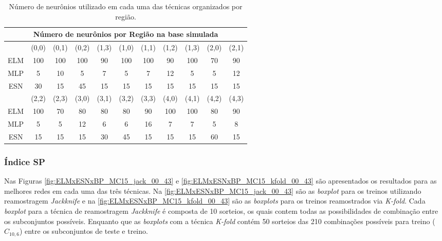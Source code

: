 \begin{table}[H]
	\centering
	\caption{Número de neurônios utilizado em cada uma das técnicas organizados por região.}
	\label{tab:nNeu_MC2015}
	\begin{small}
		\setlength{\extrarowheight}{2pt}       %
		\begin{tabular}{c*{10}c} \toprule
			\multicolumn{11}{c}{Número de neurônios por Região na base simulada}  \\ \midrule
			& (0,0) &  (0,1)  &  (0,2)  &  (1,3) &  (1,0)  &  (1,1)  &  (1,2)  &  (1,3)  & (2,0) & (2,1) \\ \cmidrule(lr){2-2}\cmidrule(lr){3-3}\cmidrule(lr){4-4}\cmidrule(lr){5-5}\cmidrule(lr){6-6}\cmidrule(lr){7-7}\cmidrule(lr){8-8}\cmidrule(lr){9-9}\cmidrule(lr){10-10}\cmidrule(lr){11-11}
		ELM	& 100 & 100 & 100 &  90 & 100 & 100 &  90 & 100 & 70 & 90 \\
		MLP	&   5 &  10 &   5 &   7 &   5 &   7 &  12 &   5 &  5 & 12 \\
     	ESN	&  30 &  15 &  45 &  15 &  15 &  15 &  15 &  15 & 15 & 15 \\ \midrule
			&  (2,2)  &  (2,3)  &  (3,0)  &  (3,1) &  (3,2)  &  (3,3)  &  (4,0)  &  (4,1)  & (4,2) & (4,3) \\ \cmidrule(lr){2-2}\cmidrule(lr){3-3}\cmidrule(lr){4-4}\cmidrule(lr){5-5}\cmidrule(lr){6-6}\cmidrule(lr){7-7}\cmidrule(lr){8-8}\cmidrule(lr){9-9}\cmidrule(lr){10-10}\cmidrule(lr){11-11}
		ELM	& 100 &  70 &  80 &  80 &  80 &  90 & 100 & 100 & 80 & 90 \\
		MLP	&   5 &   5 &  12 &   6 &   6 &  16 &   7 &   7 &  5 &  8 \\
		ESN	&  15 &  15 &  15 &  30 &  45 &  15 &  15 &  15 & 60 & 15 \\ \bottomrule
		\end{tabular}%
	\end{small}
\end{table}%

\subsubsection{Índice SP}

Nas Figuras \ref{fig:ELMxESNxBP_MC15_jack_00_43} e \ref{fig:ELMxESNxBP_MC15_kfold_00_43} são apresentados os resultados para as melhores redes em cada uma das três técnicas. Na \autoref{fig:ELMxESNxBP_MC15_jack_00_43} são as \textit{boxplot} para os treinos utilizando reamostragem \textit{Jackknife} e na \autoref{fig:ELMxESNxBP_MC15_kfold_00_43} são as \textit{boxplots} para os treinos reamostrados via \textit{K-fold}. Cada \textit{boxplot} para a técnica de reamostragem \textit{Jackknife} é composta de 10 sorteios, os quais contem todas as possibilidades de combinação entre os subconjuntos possíveis. Enquanto que as \textit{boxplots} com a técnica \textit{K-fold} contém 50 sorteios das 210 combinações possíveis para treino ($C_{10,6}$) entre os subconjuntos de teste e treino.

